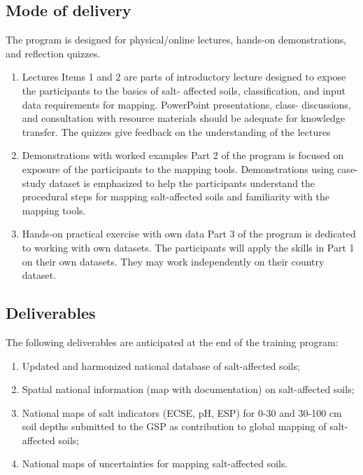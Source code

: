 \documentclass[
  10pt,
  b5paper,
]{book}
\providecommand{\tightlist}{%
  \setlength{\itemsep}{0pt}\setlength{\parskip}{0pt}}
\begin{document}
\hypertarget{mode-of-delivery}{%
\subsection{Mode of delivery}\label{mode-of-delivery}}

The program is designed for physical/online lectures, hands-on demonstrations, and reflection quizzes.

\begin{enumerate}
\def\labelenumi{\arabic{enumi})}
\tightlist
\item
  Lectures
  Items 1 and 2 are parts of introductory lecture designed to expose the participants to the basics of salt- affected soils, classification, and input data requirements for mapping. PowerPoint presentations, class- discussions, and consultation with resource materials should be adequate for knowledge transfer. The quizzes give feedback on the understanding of the lectures
\item
  Demonstrations with worked examples
  Part 2 of the program is focused on exposure of the participants to the mapping tools. Demonstrations using case-study dataset is emphasized to help the participants understand the procedural steps for mapping salt-affected soils and familiarity with the mapping tools.
\item
  Hands-on practical exercise with own data
  Part 3 of the program is dedicated to working with own datasets. The participants will apply the skills in Part 1 on their own datasets. They may work independently on their country dataset.
\end{enumerate}

\hypertarget{deliverables}{%
\subsection{Deliverables}\label{deliverables}}

The following deliverables are anticipated at the end of the training program:

\begin{enumerate}
\def\labelenumi{\roman{enumi}.}
\tightlist
\item
  Updated and harmonized national database of salt-affected soils;
\item
  Spatial national information (map with documentation) on salt-affected soils;
\item
  National maps of salt indicators (ECSE, pH, ESP) for 0-30 and 30-100 cm soil depths submitted to the GSP as contribution to global mapping of salt-affected soils;
\item
  National maps of uncertainties for mapping salt-affected soils.
\end{enumerate}
\end{document}
